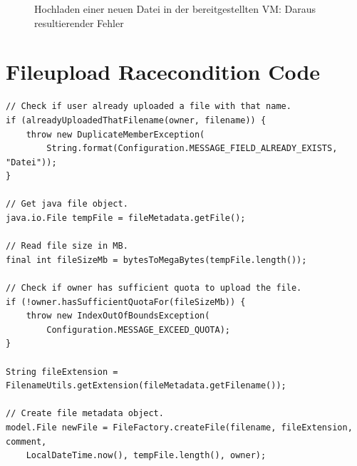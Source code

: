 \documentclass[12pt,DIV14,BCOR10mm,a4paper,parskip=half-,headsepline,headinclude,english,ngerman,bibliography=totocnumbered]{scrreprt}
\begin{document}
\begin{appendices}
\begin{figure}[!htb]
  \centering
    \label{upload_fail_1}
    \caption{Hochladen einer neuen Datei in der bereitgestellten VM: Daraus resultierender Fehler}
  \end{figure}

\chapter{Fileupload Racecondition Code}
 \label{fileuploadcode}
\begin{lstlisting}
// Check if user already uploaded a file with that name.
if (alreadyUploadedThatFilename(owner, filename)) {
    throw new DuplicateMemberException(
        String.format(Configuration.MESSAGE_FIELD_ALREADY_EXISTS, "Datei"));
}

// Get java file object.
java.io.File tempFile = fileMetadata.getFile();

// Read file size in MB.
final int fileSizeMb = bytesToMegaBytes(tempFile.length());

// Check if owner has sufficient quota to upload the file.
if (!owner.hasSufficientQuotaFor(fileSizeMb)) {
    throw new IndexOutOfBoundsException(
        Configuration.MESSAGE_EXCEED_QUOTA);
}

String fileExtension = FilenameUtils.getExtension(fileMetadata.getFilename());

// Create file metadata object.
model.File newFile = FileFactory.createFile(filename, fileExtension, comment,
    LocalDateTime.now(), tempFile.length(), owner);
\end{lstlisting}

\label{fileraceplugin}


\end{appendices}
\end{document}

